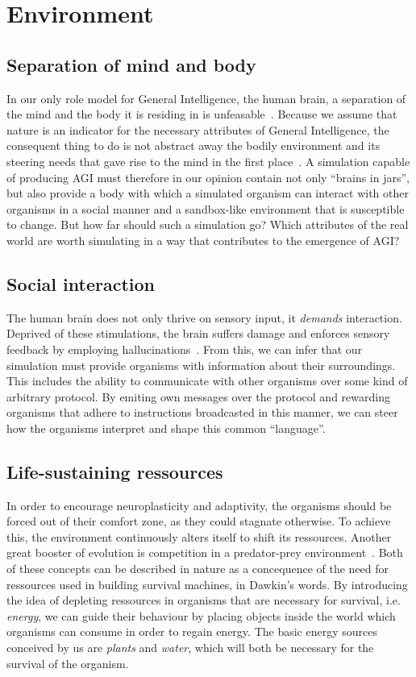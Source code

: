 \section{Environment}

\subsection{Separation of mind and body}
In our only role model for General Intelligence, the human brain, a separation of the mind and
the body it is residing in is unfeasable~\cite{Dudai2014}. Because we assume that nature is an 
indicator for the necessary attributes of General Intelligence, the consequent thing to do is not 
abstract away the bodily environment and its steering needs that gave rise to the mind in the first place~\cite{Jekely2010}. 
A simulation capable of producing AGI must therefore in our opinion contain not only ``brains in jars'', but 
also provide a body with which a simulated organism can interact with other organisms in a social manner and a 
sandbox-like environment that is susceptible to change.
But how far should such a simulation go? Which attributes of the real world are worth simulating in a way 
that contributes to the emergence of AGI\@?

\subsection{Social interaction}
The human brain does not only thrive on sensory input, it
\emph{demands} interaction. Deprived of these stimulations,
the brain suffers damage and enforces sensory feedback by employing
hallucinations~\cite{Grassian2006}. From this, we can infer that
our simulation must provide organisms with information about their surroundings.
This includes the ability to communicate with other organisms over some
kind of arbitrary protocol. By emiting own messages over the protocol and
rewarding organisms that adhere to instructions broadcasted in this manner,
we can steer how the organisms interpret and shape this common ``language''.

\subsection{Life-sustaining ressources}
In order to encourage neuroplasticity and adaptivity, the organisms should be 
forced out of their comfort zone, as they could stagnate otherwise.
To achieve this, the environment continuously alters itself to shift its ressources.
Another great booster of evolution is competition in a predator-prey environment~\cite{Dawkins1982}.
Both of these concepts can be described in nature as a concequence of the need for ressources 
used in building survival machines, in Dawkin's words. 
By introducing the idea of depleting ressources in organisms that are necessary for survival, 
i.e. \emph{energy}, we can guide their behaviour by placing objects inside the world which organisms can consume
in order to regain energy. The basic energy sources conceived by us are \emph{plants} and \emph{water}, which will
both be necessary for the survival of the organism.

